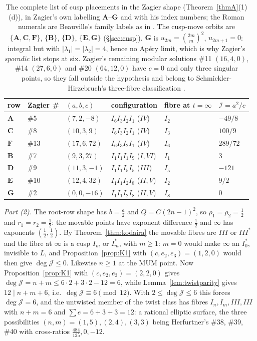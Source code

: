 \documentclass[11pt,reqno]{amsart}
\theoremstyle{plain}
\theoremstyle{definition}
\theoremstyle{remark}
\theoremstyle{plain}
\begin{document}
\begin{table}[t]
\small
\begin{tabular}{@{}llllll@{}}
\hline
row & Zagier \# & $(a,b,c)$ & configuration & fibre at $t=\infty$ & $\mathcal I=a^2/c$\\
\hline
$\mathbf A$ & \#5 & $(7,2,-8)$ & $I_6I_3I_2I_1$ ($IV$) & $I_2$ & $-49/8$\\
$\mathbf C$ & \#8 & $(10,3,9)$ & $I_6I_3I_2I_1$ ($IV$) & $I_3$ & $100/9$\\
$\mathbf F$ & \#13 & $(17,6,72)$ & $I_6I_3I_2I_1$ ($IV$) & $I_6$ & $289/72$\\
$\mathbf B$ & \#7 & $(9,3,27)$ & $I_1I_1I_1I_9$ ($I,VI$) & $I_1$ & $3$\\
$\mathbf D$ & \#9 & $(11,3,-1)$ & $I_1I_1I_5I_5$ ($III$) & $I_5$ & $-121$\\
$\mathbf E$ & \#10 & $(12,4,32)$ & $I_1I_1I_2I_8$ ($II,V$) & $I_2$ & $9/2$\\
$\mathbf G$ & \#2 & $(0,0,-16)$ & $I_1I_1I_2I_8$ ($II,V$) & $I_8$ & $0$\\
\hline
\end{tabular}
\medskip
\caption{The complete list of cusp placements in the Zagier shape
\textup{(}Theorem~\ref{thmA}(1)(d)\textup{)}, in Zagier's own labelling
$\mathbf A$--$\mathbf G$ and with his index numbers; the Roman numerals are
Beauville's family labels as in \cite[\S7]{Zagier2009}. The cusp-move orbits are
$\{\mathbf A,\mathbf C,\mathbf F\}$, $\{\mathbf B\}$, $\{\mathbf D\}$,
$\{\mathbf E,\mathbf G\}$ \textup{(}\S\ref{sec:cusp}\textup{)}. $\mathbf G$ is
$u_{2m}=\binom{2m}m^2$, $u_{2m+1}=0$: integral but with
$|\lambda_1|=|\lambda_2|=4$, hence no Ap\'ery limit, which is why Zagier's
\emph{sporadic} list stops at six. Zagier's remaining modular solutions \#11
$(16,4,0)$, \#14 $(27,6,0)$ and \#20 $(64,12,0)$ have $c=0$ and only three
singular points, so they fall outside the hypothesis and belong to
Schmickler-Hirzebruch's three-fibre classification
\cite{SchmicklerHirzebruch}.}\label{tab:placements}
\end{table}

\emph{Part \textup{(2)}.} The root-row shape has $b=\tfrac a2$ and
$Q=C(2n-1)^2$, so $\rho_1=\rho_2=\tfrac12$ and $r_1=r_2=\tfrac12$: the movable
points have exponent difference $\tfrac12$ and $\infty$ has exponents
$(\tfrac12,\tfrac12)$. By Theorem~\ref{thm:kodaira} the movable fibres are $III$
or $III^*$ and the fibre at $\infty$ is a cusp $I_m$ or $I_m^*$, with $m\ge1$:
$m=0$ would make $\infty$ an $I_0^*$, invisible to $L$, and
Proposition~\ref{prop:K1} with $(c,e_2,e_3)=(1,2,0)$ would then give
$\deg\mathcal J\le0$. Likewise $n\ge1$ at the MUM point. Now
Proposition~\ref{prop:K1} with $(c,e_2,e_3)=(2,2,0)$ gives
$\deg\mathcal J=n+m\le6\cdot2+3\cdot2-12=6$, while Lemma~\ref{lem:twistparity}
gives $12\mid n+m+6$, i.e.\ $\deg\mathcal J\equiv6\pmod{12}$. With
$2\le\deg\mathcal J\le6$ this forces $\deg\mathcal J=6$, and the untwisted member
of the twist class has fibres $I_n,I_m,III,III$ with $n+m=6$ and
$\sum e=6+3+3=12$: a rational elliptic surface, the three possibilities
$(n,m)=(1,5),(2,4),(3,3)$ being Herfurtner's \#38, \#39, \#40 with cross-ratios
$\tfrac{484}{125},0,-12$.
\end{document}
